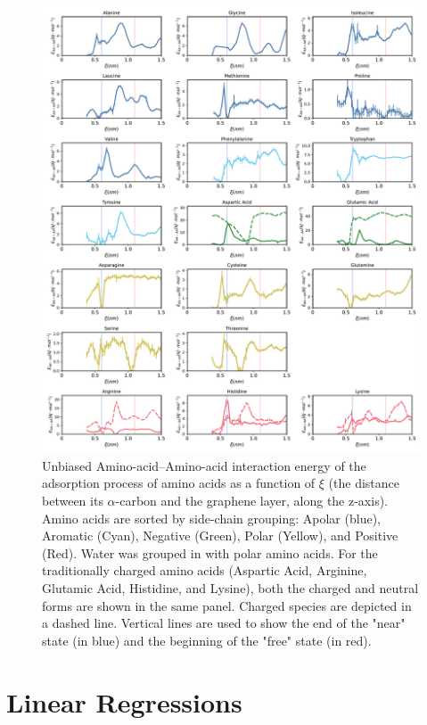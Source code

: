 \documentclass[9pt]{article}
\begin{document}
\begin{figure}[hbtp]
    \centering
    \includegraphics[width=\textwidth]{FigS8.pdf}
    \caption{Unbiased Amino-acid--Amino-acid interaction energy of the adsorption process of amino acids as a function of $\xi$ (the distance between its $\alpha$-carbon and the graphene layer, along the z-axis). Amino acids are sorted by side-chain grouping: Apolar (blue), Aromatic (Cyan), Negative (Green), Polar (Yellow), and Positive (Red). Water was grouped in with polar amino acids. For the traditionally charged amino acids (Aspartic Acid, Arginine, Glutamic Acid,  Histidine, and Lysine), both the charged and neutral forms are shown in the same panel. Charged species are depicted in a dashed line. Vertical lines are used to show the end of the "near" state (in blue) and the beginning of the "free" state (in red).}
    \label{fig:EnergyAA-AA}
\end{figure}

\newpage

\section{Linear Regressions}
\end{document}
